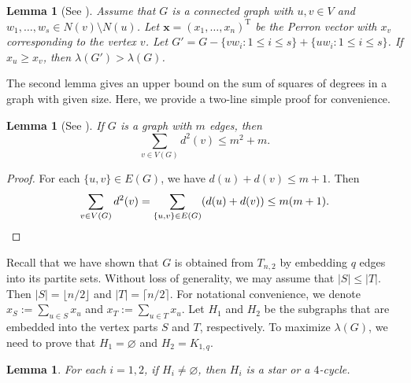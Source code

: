 \documentclass[11pt]{article}
\newtheorem{lemma}[theorem]{Lemma}
\begin{document}
 \begin{lemma}[See \cite{WXH2005}]  \label{lem-WXH}
 Assume that $G$ is a connected graph with 
 $u,v\in V$ and $w_1,\ldots ,w_s\in N(v)\setminus N(u)$. 
 Let $\bm{x}=(x_1,\ldots ,x_n)^{\mathrm{T}}$ be the Perron vector 
 with $x_v$ corresponding to the vertex $v$. 
 Let $G'=G-\{vw_i: 1\le i\le s\} + 
 \{uw_i: 1\le i \le s\}$. If ${x}_u\ge {x}_v$, 
 then $\lambda (G') > \lambda (G)$. 
 \end{lemma}
 


The second lemma gives an upper bound 
 on the sum of squares of degrees in a graph with given size. 
 Here, we provide a two-line simple proof for convenience. 
  
 \begin{lemma}[See \cite{Das2003,NZ2021b}] \label{lem-deg-squ}
If $G$ is a graph with $m$ edges, then  
\[  \sum_{v\in V(G)}d^2(v) \le m^2 +m. \]  
 \end{lemma} 
 
 \begin{proof}
For each $\{u,v\} \in E(G)$, we have 
$d(u) + d(v)\le m+1$. 
Then 
\[ \sum_{v\in V(G)} d^2(v) 
= \sum_{\{u,v\} \in E(G)} (d(u) + d(v)) 
\le m(m+1). \qedhere \]  
 \end{proof}
 
 
Recall that 
we have shown that $G$ is obtained from 
 $T_{n,2}$ by embedding $q $ edges into its partite sets. 
Without loss of generality, we may assume that $|S|\le |T|$. 
Then $|S|=\lfloor {n}/{2}\rfloor$ 
and $|T|=\lceil {n}/{2}\rceil$. 
For notational convenience, 
we denote $x_S:=\sum_{u\in S} x_u$ and $x_T:=\sum_{u\in T} x_u$. Let $H_1$ and $H_2$ be the subgraphs that are embedded 
into the vertex parts $S$ and $T$, respectively. 
To maximize $\lambda (G)$, 
we need to prove that $H_1=\varnothing$ 
and $H_2=K_{1,q}$. 


\begin{lemma} \label{lem-star}
For each $i=1,2$, if $H_i \neq \varnothing$, then $H_i $ is a star 
or a $4$-cycle. 
\end{lemma}
\end{document}
